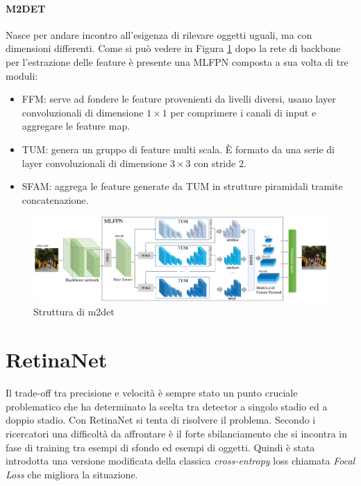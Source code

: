 \paragraph{M2DET} \cite{zhao2019m2det}
Nasce per andare incontro all'esigenza di rilevare oggetti uguali, ma con dimensioni differenti. Come si può vedere in Figura \ref{fig:m2det_architectures} dopo la rete di backbone per l'estrazione delle feature è presente una \ac{MLFPN} composta a sua volta di tre moduli:
\begin{itemize}
    \item \ac{FFM}: serve ad fondere le feature provenienti da livelli diversi, usano layer convoluzionali di dimensione $1 \times 1$ per comprimere i canali di input e aggregare le feature map. 
    \item \ac{TUM}: genera un gruppo di feature multi scala. È formato da una serie di layer convoluzionali di dimensione $3 \times 3$ con stride $2$. 
    \item \ac{SFAM}: aggrega le feature generate da \ac{TUM} in strutture piramidali tramite concatenazione.
\end{itemize}
\begin{figure}
    \centering
    \includegraphics[width=\textwidth]{images/pipeline_m2det.pdf}
    \caption{Struttura di m2det \cite{zhao2019m2det}}
    \label{fig:m2det_architectures}
\end{figure}

\section{RetinaNet}
\label{sec:retinanet}
Il trade-off tra precisione e velocità è sempre stato un punto cruciale problematico che ha determinato la scelta tra detector a singolo stadio ed a doppio stadio. Con RetinaNet \cite{lin2017focal} si tenta di risolvere il problema. Secondo i ricercatori una difficoltà da affrontare è il forte sbilanciamento che si incontra in fase di training tra esempi di sfondo ed esempi di oggetti. Quindi è stata introdotta una versione modificata della classica \textit{cross-entropy} loss chiamata \textit{Focal Loss} che migliora la situazione. 
